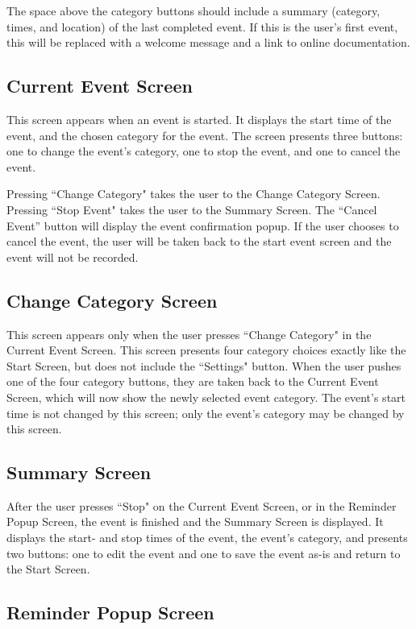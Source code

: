 \documentclass[11pt]{article}
\begin{document}
The space above the category buttons should include a summary (category, times, and location) of the last completed event. If this is the user's first event, this will be replaced with a welcome message and a link to online documentation.

\subsection{Current Event Screen}

This screen appears when an event is started. It displays the start time of the event, and the chosen category for the event. The screen presents three buttons: one to change the event's category, one to stop the event, and one to cancel the event.

Pressing ``Change Category" takes the user to the Change Category Screen. Pressing ``Stop Event" takes the user to the Summary Screen. The ``Cancel Event'' button will display the event confirmation popup. If the user chooses to cancel the event, the user will be taken back to the start event screen and the event will not be recorded.

\subsection{Change Category Screen}

This screen appears only when the user presses ``Change Category" in the Current Event Screen. This screen presents four category choices exactly like the Start Screen, but does not include the ``Settings" button. When the user pushes one of the four category buttons, they are taken back to the Current Event Screen, which will now show the newly selected event category. The event's start time is not changed by this screen; only the event's category may be changed by this screen.

\subsection{Summary Screen}

After the user presses ``Stop" on the Current Event Screen, or in the Reminder Popup Screen, the event is finished and the Summary Screen is displayed. It displays the start- and stop times of the event, the event's category, and presents two buttons: one to edit the event and one to save the event as-is and return to the Start Screen.

\subsection{Reminder Popup Screen}
\end{document}

